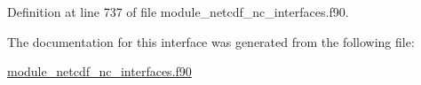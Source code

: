 Definition at line 737 of file module\+\_\+netcdf\+\_\+nc\+\_\+interfaces.\+f90.



The documentation for this interface was generated from the following file\+:\begin{DoxyCompactItemize}
\item 
\hyperlink{module__netcdf__nc__interfaces_8f90}{module\+\_\+netcdf\+\_\+nc\+\_\+interfaces.\+f90}\end{DoxyCompactItemize}
